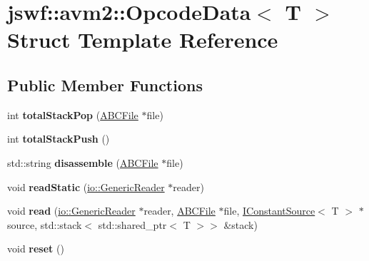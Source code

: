 \hypertarget{structjswf_1_1avm2_1_1_opcode_data}{\section{jswf\+:\+:avm2\+:\+:Opcode\+Data$<$ T $>$ Struct Template Reference}
\label{structjswf_1_1avm2_1_1_opcode_data}
}
\subsection*{Public Member Functions}
\begin{DoxyCompactItemize}
\item 
\hypertarget{structjswf_1_1avm2_1_1_opcode_data_a4f814f41347c9425bd022625624c8a8e}{int {\bfseries total\+Stack\+Pop} (\hyperlink{classjswf_1_1avm2_1_1_a_b_c_file}{A\+B\+C\+File} $\ast$file)}\label{structjswf_1_1avm2_1_1_opcode_data_a4f814f41347c9425bd022625624c8a8e}

\item 
\hypertarget{structjswf_1_1avm2_1_1_opcode_data_a4c356a33d952a319e06223af2af7341e}{int {\bfseries total\+Stack\+Push} ()}\label{structjswf_1_1avm2_1_1_opcode_data_a4c356a33d952a319e06223af2af7341e}

\item 
\hypertarget{structjswf_1_1avm2_1_1_opcode_data_ae1b8523d20e225b77cd2c8ba862df9ab}{std\+::string {\bfseries disassemble} (\hyperlink{classjswf_1_1avm2_1_1_a_b_c_file}{A\+B\+C\+File} $\ast$file)}\label{structjswf_1_1avm2_1_1_opcode_data_ae1b8523d20e225b77cd2c8ba862df9ab}

\item 
\hypertarget{structjswf_1_1avm2_1_1_opcode_data_a7ded76a7b97932ced3591d2e758aeb97}{void {\bfseries read\+Static} (\hyperlink{classjswf_1_1io_1_1_generic_reader}{io\+::\+Generic\+Reader} $\ast$reader)}\label{structjswf_1_1avm2_1_1_opcode_data_a7ded76a7b97932ced3591d2e758aeb97}

\item 
\hypertarget{structjswf_1_1avm2_1_1_opcode_data_a8620fae57701d76b036fbcc194a6df6b}{void {\bfseries read} (\hyperlink{classjswf_1_1io_1_1_generic_reader}{io\+::\+Generic\+Reader} $\ast$reader, \hyperlink{classjswf_1_1avm2_1_1_a_b_c_file}{A\+B\+C\+File} $\ast$file, \hyperlink{classjswf_1_1avm2_1_1_i_constant_source}{I\+Constant\+Source}$<$ T $>$ $\ast$source, std\+::stack$<$ std\+::shared\+\_\+ptr$<$ T $>$$>$ \&stack)}\label{structjswf_1_1avm2_1_1_opcode_data_a8620fae57701d76b036fbcc194a6df6b}

\item 
\hypertarget{structjswf_1_1avm2_1_1_opcode_data_afe38d8ab12bc17214a1332142339b467}{void {\bfseries reset} ()}\label{structjswf_1_1avm2_1_1_opcode_data_afe38d8ab12bc17214a1332142339b467}

\end{DoxyCompactItemize}
